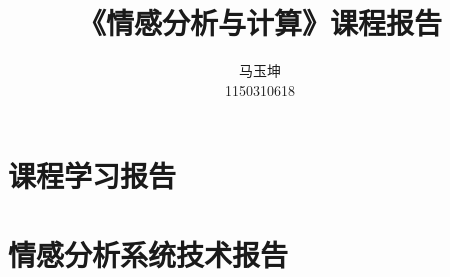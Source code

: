 \documentclass[11pt, a4paper]{article}
\begin{document}
\title{{\fontsize{18}{20}\heiti 《情感分析与计算》课程报告}}
\author{{\fontsize{12}{13} 马玉坤}\\{\fontsize{10.5}{13} 1150310618}}
\maketitle

\thispagestyle{main}




\section{课程学习报告}




\section{情感分析系统技术报告}
\end{document}
